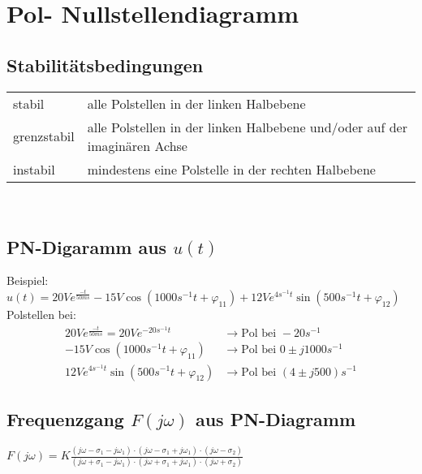 \section{Pol- Nullstellendiagramm}
\subsection{Stabilitätsbedingungen}
\begin{tabular}{ll}
	stabil & alle Polstellen in der linken Halbebene\\
	grenzstabil & alle Polstellen in der linken Halbebene und/oder auf der
	imaginären Achse\\
	instabil & mindestens eine Polstelle in der rechten Halbebene
\end{tabular}\\

\subsection{PN-Digaramm aus $u(t)$}
Beispiel:
$u(t)=20Ve^{\frac{-t}{50ms}}-15V\cos(1000s^{-1}t+\varphi_{11})+12Ve^{4s^{-1}t}\sin(500s^{-1}t+\varphi_{12})$\\
Polstellen bei: \\
\begin{align}
	20Ve^{\frac{-t}{50ms}} = 20Ve^{-20s^{-1}t} &\rightarrow \text{Pol bei }
	-20s^{-1}\nonumber\\
	-15V\cos(1000s^{-1}t+\varphi_{11}) &\rightarrow \text{Pol bei }
	0\pm j1000s^{-1}\nonumber\\
	12Ve^{4s^{-1}t}\sin(500s^{-1}t+\varphi_{12}) &\rightarrow \text{Pol bei } (4\pm
	j500)s^{-1}\nonumber
\end{align}



\subsection{Frequenzgang $F(j\omega)$ aus PN-Diagramm}

$F(j\omega)=K\frac{(j\omega-\sigma_1-j\omega_1)\cdot(j\omega-\sigma_1+j\omega_1)\cdot(j\omega-\sigma_2)}{(j\omega+\sigma_1-j\omega_1)\cdot(j\omega+\sigma_1+j\omega_1)\cdot(j\omega+\sigma_2)}$
